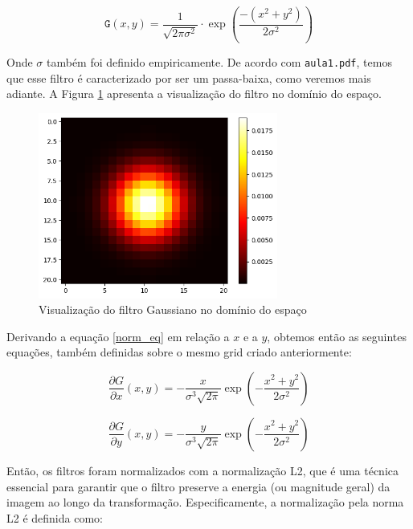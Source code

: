 \documentclass[a4paper, 11pt]{article}
\begin{document}
\begin{equation}
    \mathtt{G}(x,y) = \dfrac{1}{\sqrt{2  \pi  \sigma^2}} \cdot \exp \left(\dfrac{-(x^2+y^2)}{2 \sigma ^2}\right)
    \label{norm_eq}
\end{equation}

Onde $\sigma$ também foi definido empiricamente. De acordo com \texttt{aula1.pdf}, temos que esse filtro é caracterizado por ser um passa-baixa, como veremos mais adiante. A Figura \ref{fig:norm_esp} apresenta a visualização do filtro no domínio do espaço.

\begin{figure}[H]
    \centering 
    \includegraphics[width=0.7\textwidth]{imgs/norm_esp.png}
    \caption{Visualização do filtro Gaussiano no domínio do espaço}
    \label{fig:norm_esp} 
\end{figure}

Derivando a equação \ref{norm_eq} em relação a $x$ e a $y$, obtemos então as seguintes equações, também definidas sobre o mesmo grid criado anteriormente:

\begin{equation}
    \frac{\partial G}{\partial x}(x,y) = -\frac{x}{\sigma^3 \sqrt{2\pi}} \exp\left(-\frac{x^2 + y^2}{2\sigma^2}\right)
    \label{norm_eq_x}
\end{equation}

\begin{equation}
    \frac{\partial G}{\partial y}(x,y) = -\frac{y}{\sigma^3 \sqrt{2\pi}} \exp\left(-\frac{x^2 + y^2}{2\sigma^2}\right)
    \label{norm_eq_y}
\end{equation}

Então, os filtros foram normalizados com a normalização L2, que é uma técnica essencial para garantir que o filtro preserve a energia (ou magnitude geral) da imagem ao longo da transformação. Especificamente, a normalização pela norma L2 é definida como:
\end{document}
